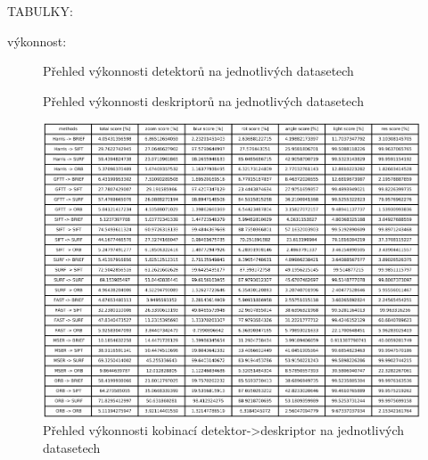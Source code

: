 TABULKY:

výkonnost:

\begin{figure}[htp] 
	\label{det_perf}
	\caption{Přehled výkonnosti detektorů na jednotlivých datasetech}
\end{figure}

\begin{figure}[htp] 
	\label{desc_perf}
	\caption{Přehled výkonnosti deskriptorů na jednotlivých datasetech}
\end{figure}

\begin{figure}[h] 
	\label{det_desc_perf}
	\centering{}
		\includegraphics[scale=1]{text_img/Det_desc_perf.pdf}
	\caption{Přehled výkonnosti kobinací detektor->deskriptor na jednotlivých datasetech}
\end{figure}

